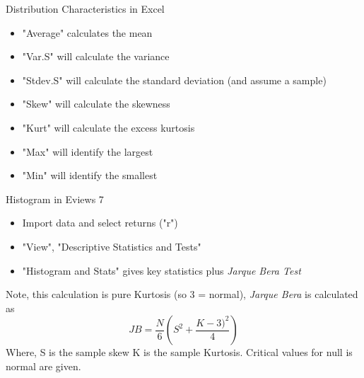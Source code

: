 \documentclass[14pt,xcolor=pdftex,dvipsnames,table]{beamer}
\begin{document}
\begin{frame}{Distribution Characteristics in Excel}
\begin{itemize}
\item "Average" calculates the mean
\item "Var.S" will calculate the variance
\item "Stdev.S" will calculate the standard deviation (and assume a sample)
\item "Skew" will calculate the skewness 
\item "Kurt" will calculate the excess kurtosis
\item "Max" will identify the largest 
\item "Min" will identify the smallest
\end{itemize}
\end{frame}

\begin{frame}{Histogram in Eviews 7}
\begin{itemize}
\item Import data and select returns ("r")
\item "View", "Descriptive Statistics and Tests"
\item "Histogram and Stats" gives key statistics plus \emph{Jarque Bera Test}
\end{itemize}
Note, this calculation is pure Kurtosis (so 3 = normal), \emph{Jarque Bera} is calculated as
\begin{equation}
JB = \frac{N}{6}\left ( S^2 + \frac{K - 3)^2}{4} \right )
\end{equation} 
Where, S is the sample skew K is the sample Kurtosis.  Critical values for null is normal are given. 
\end{frame}


\end{document}
